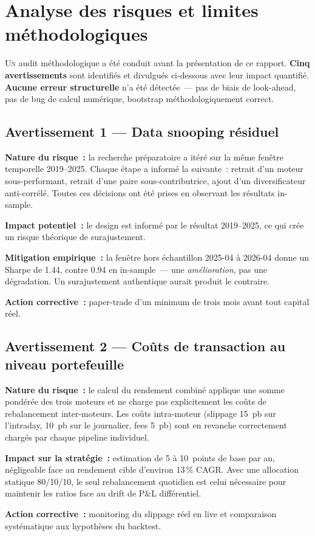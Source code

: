 \section{Analyse des risques et limites méthodologiques}
\label{sec:limitations}

\lettrine[lines=2, findent=2pt, nindent=0pt]{U}{n} audit méthodologique a été conduit avant la présentation de ce rapport. \textbf{Cinq avertissements} sont identifiés et divulgués ci-dessous avec leur impact quantifié. \textbf{Aucune erreur structurelle} n'a été détectée~--- pas de biais de look-ahead, pas de bug de calcul numérique, bootstrap méthodologiquement correct.

\subsection{Avertissement 1 --- Data snooping résiduel}

\begin{warningbox}
\textbf{Nature du risque~:} la recherche préparatoire a itéré sur la même fenêtre temporelle 2019--2025. Chaque étape a informé la suivante~: retrait d'un moteur sous-performant, retrait d'une paire sous-contributrice, ajout d'un diversificateur anti-corrélé. Toutes ces décisions ont été prises en observant les résultats in-sample.

\textbf{Impact potentiel~:} le design est informé par le résultat 2019--2025, ce qui crée un risque théorique de surajustement.

\textbf{Mitigation empirique~:} la fenêtre hors échantillon 2025-04 à 2026-04 donne un Sharpe de 1.44, contre 0.94 en in-sample~--- une \emph{amélioration}, pas une dégradation. Un surajustement authentique aurait produit le contraire.

\textbf{Action corrective~:} paper-trade d'un minimum de trois mois avant tout capital réel.
\end{warningbox}

\subsection{Avertissement 2 --- Coûts de transaction au niveau portefeuille}

\begin{warningbox}
\textbf{Nature du risque~:} le calcul du rendement combiné applique une somme pondérée des trois moteurs et ne charge pas explicitement les coûts de rebalancement inter-moteurs. Les coûts intra-moteur (slippage 15~pb sur l'intraday, 10~pb sur le journalier, fees 5~pb) sont en revanche correctement chargés par chaque pipeline individuel.

\textbf{Impact sur la stratégie~:} estimation de 5 à 10~points de base par an, négligeable face au rendement cible d'environ 13\,\% CAGR. Avec une allocation statique 80/10/10, le seul rebalancement quotidien est celui nécessaire pour maintenir les ratios face au drift de P\&L différentiel.

\textbf{Action corrective~:} monitoring du slippage réel en live et comparaison systématique aux hypothèses du backtest.
\end{warningbox}

